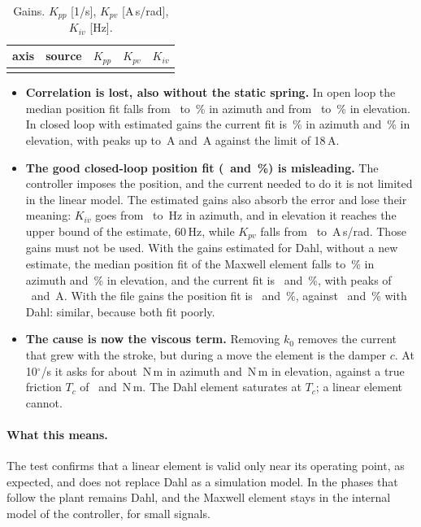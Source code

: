 \documentclass[10pt,a4paper]{article}
\numberwithin{equation}{section}
\begin{document}
\begin{table}[H]\centering\footnotesize
\caption{Gains. $K_{pp}$ [1/s], $K_{pv}$ [A\,s/rad], $K_{iv}$ [Hz].}\label{tab:td_gains}
\begin{tabular}{llrrr}\toprule
axis & source & $K_{pp}$ & $K_{pv}$ & $K_{iv}$ \\ \midrule
\\ \bottomrule
\end{tabular}\end{table}

\begin{itemize}
\item \textbf{Correlation is lost, also without the static spring.} In open loop the median position fit falls from \olDA\ to \olMA\,\% in azimuth and from \olDP\ to \olMP\,\% in elevation. In closed loop with estimated gains the current fit is \clCA\,\% in azimuth and \clCP\,\% in elevation, with peaks up to \peakMA\,A and \peakMP\,A against the limit of 18\,A.
\item \textbf{The good closed-loop position fit (\clEA\ and \clEP\,\%) is misleading.} The controller imposes the position, and the current needed to do it is not limited in the linear model. The estimated gains also absorb the error and lose their meaning: $K_{iv}$ goes from \kivDA\ to \kivMA\,Hz in azimuth, and in elevation it reaches the upper bound of the estimate, 60\,Hz, while $K_{pv}$ falls from \kpvDP\ to \kpvMP\,A\,s/rad. Those gains must not be used. With the gains estimated for Dahl, without a new estimate, the median position fit of the Maxwell element falls to \clGA\,\% in azimuth and \clGP\,\% in elevation, and the current fit is \clGCA\ and \clGCP\,\%, with peaks of \peakDGA\ and \peakDGP\,A. With the file gains the position fit is \clFA\ and \clFP\,\%, against \clFDA\ and \clFDP\,\% with Dahl: similar, because both fit poorly.
\item \textbf{The cause is now the viscous term.} Removing $k_0$ removes the current that grew with the stroke, but during a move the element is the damper $c$. At 10$^\circ$/s it asks for about \tqA\,N\,m in azimuth and \tqP\,N\,m in elevation, against a true friction $T_c$ of \tcA\ and \tcP\,N\,m. The Dahl element saturates at $T_c$; a linear element cannot.
\end{itemize}

\paragraph{What this means.} The test confirms that a linear element is valid only near its operating point, as expected, and does not replace Dahl as a simulation model. In the phases that follow the plant remains Dahl, and the Maxwell element stays in the internal model of the controller, for small signals.
\end{document}
